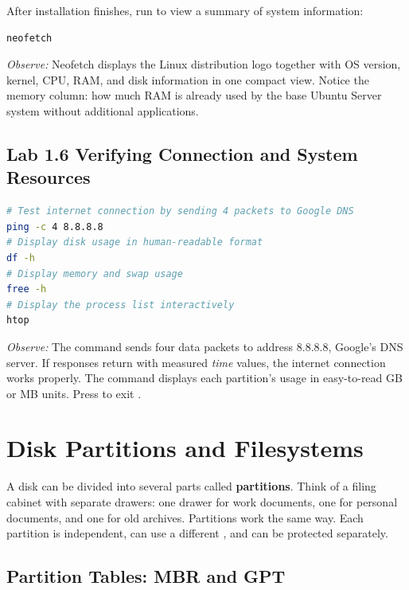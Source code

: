 After installation finishes, run  to view a summary of system information:

\begin{lstlisting}[language=bash, caption={Displaying system information}]
neofetch
\end{lstlisting}

\textit{Observe:} Neofetch displays the Linux distribution logo together with OS version, kernel, CPU, RAM, and disk information in one compact view. Notice the memory column: how much RAM is already used by the base Ubuntu Server system without additional applications.

\subsection*{Lab 1.6 Verifying Connection and System Resources}

\begin{lstlisting}[language=bash, caption={Checking network and resources}]
# Test internet connection by sending 4 packets to Google DNS
ping -c 4 8.8.8.8
# Display disk usage in human-readable format
df -h
# Display memory and swap usage
free -h
# Display the process list interactively
htop
\end{lstlisting}

\textit{Observe:} The  command sends four data packets to address 8.8.8.8, Google's DNS server. If responses return with measured \textit{time} values, the internet connection works properly. The  command displays each partition's usage in easy-to-read GB or MB units. Press  to exit .

\section{Disk Partitions and Filesystems}
\label{sec:disk-partitioning}

A disk can be divided into several parts called \textbf{partitions}. Think of a filing cabinet with separate drawers: one drawer for work documents, one for personal documents, and one for old archives. Partitions work the same way. Each partition is independent, can use a different , and can be protected separately.

\subsection{Partition Tables: MBR and GPT}

